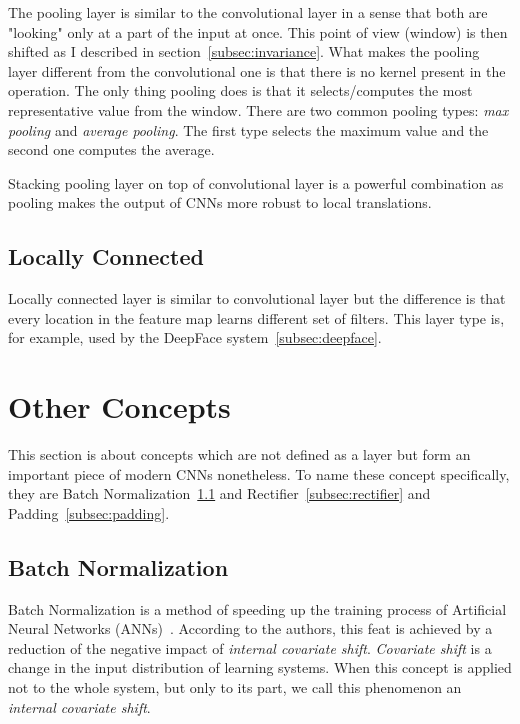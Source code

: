 The pooling layer is similar to the convolutional layer in a sense that both are "looking" only at a part of the input
at once.
This point of view (window) is then shifted as I described in section~\ref{subsec:invariance}.
What makes the pooling layer different from the convolutional one is that there is no kernel present in the operation.
The only thing pooling does is that it selects/computes the most representative value from the window.
There are two common pooling types: \textit{max pooling} and \textit{average pooling}.
The first type selects the maximum value and the second one computes the average.

Stacking pooling layer on top of convolutional layer is a powerful combination as pooling makes the output of CNNs
more robust to local translations\cite{DeepFace}.

\subsection{Locally Connected}\label{subsec:lclayer}
Locally connected layer is similar to convolutional layer but the difference is that every location in the feature map
learns different set of filters.
This layer type is, for example, used by the DeepFace system~\ref{subsec:deepface}.

\section{Other Concepts}\label{sec:otherconc}
This section is about concepts which are not defined as a layer but form an important piece of modern CNNs nonetheless.
To name these concept specifically, they are Batch Normalization~\ref{subsec:batchnorm} and
Rectifier~\ref{subsec:rectifier} and Padding~\ref{subsec:padding}.

\subsection{Batch Normalization}\label{subsec:batchnorm}
Batch Normalization is a method of speeding up the training process of Artificial Neural
Networks (ANNs)~\cite{BatchNormalization}.
According to the authors, this feat is achieved by a reduction of the negative impact of \textit{internal covariate
shift}.
\textit{Covariate shift} is a change in the input distribution of learning systems.
When this concept is applied not to the whole system, but only to its part, we call this phenomenon an \textit{internal
covariate shift}.

